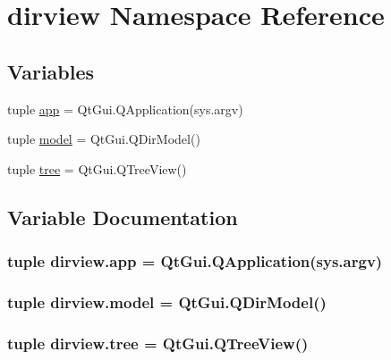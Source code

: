 \hypertarget{namespacedirview}{}\section{dirview Namespace Reference}
\label{namespacedirview}
\subsection*{Variables}
\begin{DoxyCompactItemize}
\item 
tuple \hyperlink{namespacedirview_ab18ff20177114e634b99aa090b2a4c6f}{app} = Qt\+Gui.\+Q\+Application(sys.\+argv)
\item 
tuple \hyperlink{namespacedirview_ae918d6502455376eb50a4f0bb77972ff}{model} = Qt\+Gui.\+Q\+Dir\+Model()
\item 
tuple \hyperlink{namespacedirview_a0c7bcc6c92a6733781564d06efd2aeab}{tree} = Qt\+Gui.\+Q\+Tree\+View()
\end{DoxyCompactItemize}


\subsection{Variable Documentation}
\hypertarget{namespacedirview_ab18ff20177114e634b99aa090b2a4c6f}{}
\subsubsection[{app}]{\setlength{\rightskip}{0pt plus 5cm}tuple dirview.\+app = Qt\+Gui.\+Q\+Application(sys.\+argv)}\label{namespacedirview_ab18ff20177114e634b99aa090b2a4c6f}
\hypertarget{namespacedirview_ae918d6502455376eb50a4f0bb77972ff}{}
\subsubsection[{model}]{\setlength{\rightskip}{0pt plus 5cm}tuple dirview.\+model = Qt\+Gui.\+Q\+Dir\+Model()}\label{namespacedirview_ae918d6502455376eb50a4f0bb77972ff}
\hypertarget{namespacedirview_a0c7bcc6c92a6733781564d06efd2aeab}{}
\subsubsection[{tree}]{\setlength{\rightskip}{0pt plus 5cm}tuple dirview.\+tree = Qt\+Gui.\+Q\+Tree\+View()}\label{namespacedirview_a0c7bcc6c92a6733781564d06efd2aeab}
